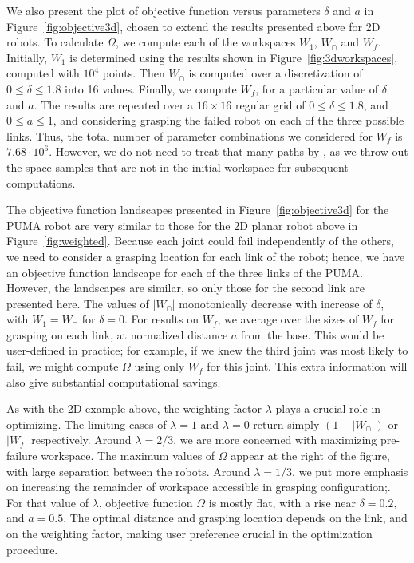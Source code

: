 \documentclass[12pt]{report}
\begin{document}
We also present the plot of objective function versus parameters $\delta$ and $a$ in Figure~\ref{fig:objective3d}, chosen to extend the  results presented above for 2D robots.  To calculate  $\Omega$, we compute each of the workspaces $W_1$, $W_\cap$ and $W_f$.  Initially, $W_1$ is determined using the results shown in Figure~\ref{fig:3dworkspaces}, computed with $10^4$ points.  Then $W_\cap$ is computed over a discretization of $0 \leq \delta \leq 1.8$ into 16 values.  Finally, we compute $W_f$, for a particular value of $\delta$ and $a$. The results are repeated over a $16 \times 16$ regular grid of $0\leq \delta \leq 1.8$, and $0\leq a \leq 1$, and considering grasping the failed robot on each of the three possible links. Thus, the total number of parameter combinations we considered for $W_f$ is $7.68 \cdot 10^6$. However, we do not need to treat that many paths by \bertini, as we throw out the space samples that are not in the initial workspace for subsequent computations.


The objective function landscapes presented in Figure~\ref{fig:objective3d} for the PUMA robot are very similar to those for the 2D planar robot above in Figure~\ref{fig:weighted}.  Because each joint could fail independently of the others, we need to consider a grasping location for each link of the robot; hence, we have an objective function landscape for each of the three links of the PUMA.  However, the landscapes are similar, so only those for the second link are presented here. The values of $|W_\cap|$ monotonically decrease with increase of $\delta$, with $W_1 = W_\cap$ for $\delta = 0$.  For results on $W_f$, we average over the sizes of $W_f$ for grasping on each link, at normalized distance $a$ from the base.  This would be user-defined in practice; for example, if we knew the third joint was most likely to fail, we might compute $\Omega$ using only $W_f$ for this joint.  This extra information will also give substantial computational savings. 

	As with the 2D example above, the weighting factor $\lambda$ plays a crucial role in optimizing.  The limiting cases of $\lambda=1$ and $\lambda=0$ return simply $(1 - |W_\cap|)$ or $|W_f|$ respectively.  Around $\lambda = 2/3$, we are more concerned with maximizing pre-failure workspace.  The maximum values of $\Omega$ appear at the right of the figure, with large separation between the robots.  Around $\lambda = 1/3$, we put more emphasis on increasing the remainder of workspace accessible in grasping configuration;. For that value of $\lambda$, objective function  $\Omega$ is mostly flat, with a rise near $\delta = 0.2$, and $a = 0.5$.  The optimal distance and grasping location depends on the link, and on the weighting factor, making user preference crucial in the optimization procedure. 
\end{document}

